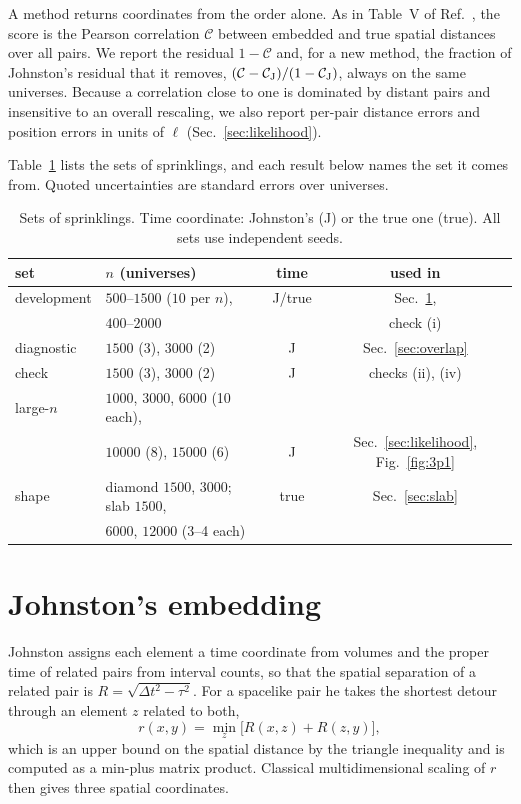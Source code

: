 \documentclass[prd,twocolumn,superscriptaddress,nofootinbib,amsmath,amssymb,floatfix]{revtex4-2}
\begin{document}
A method returns coordinates from the order alone. As in Table~V of Ref.~\cite{Johnston25}, the score is the Pearson correlation $\mathcal C$ between embedded and true spatial distances over all pairs. We report the residual $1-\mathcal C$ and, for a new method, the fraction of Johnston's residual that it removes, $(\mathcal C-\mathcal C_{\rm J})/(1-\mathcal C_{\rm J})$, always on the same universes. Because a correlation close to one is dominated by distant pairs and insensitive to an overall rescaling, we also report per-pair distance errors and position errors in units of $\ell$ (Sec.~\ref{sec:likelihood}).

Table~\ref{tab:sets} lists the sets of sprinklings, and each result below names the set it comes from. Quoted uncertainties are standard errors over universes.

\begin{table}[t]
\caption{Sets of sprinklings. Time coordinate: Johnston's (J) or the true one (true). All sets use independent seeds.}
\label{tab:sets}
\setlength{\tabcolsep}{2pt}\small
\begin{ruledtabular}
\begin{tabular}{llcc}
set & $n$ (universes) & time & used in\\
\hline
development & $500$--$1500$ ($10$ per $n$), & J/true & Sec.~\ref{sec:johnston},\\
 & $400$--$2000$ & & check (i)\\
diagnostic & $1500$ (3), $3000$ (2) & J & Sec.~\ref{sec:overlap}\\
check & $1500$ (3), $3000$ (2) & J & checks (ii), (iv)\\
large-$n$ & $1000$, $3000$, $6000$ (10 each),\\
 & $10000$ (8), $15000$ (6) & J & Sec.~\ref{sec:likelihood}, Fig.~\ref{fig:3p1}\\
shape & diamond $1500$, $3000$; slab $1500$, & true & Sec.~\ref{sec:slab}\\
 & $6000$, $12000$ (3--4 each) & & \\
\end{tabular}
\end{ruledtabular}
\end{table}

\section{Johnston's embedding}\label{sec:johnston}
Johnston assigns each element a time coordinate from volumes and the proper time of related pairs from interval counts, so that the spatial separation of a related pair is $R=\sqrt{\Delta t^2-\tau^2}$. For a spacelike pair he takes the shortest detour through an element $z$ related to both,
\begin{equation}
r(x,y)=\min_z\big[R(x,z)+R(z,y)\big],
\label{eq:detour}
\end{equation}
which is an upper bound on the spatial distance by the triangle inequality and is computed as a min-plus matrix product. Classical multidimensional scaling of $r$ then gives three spatial coordinates.
\end{document}
